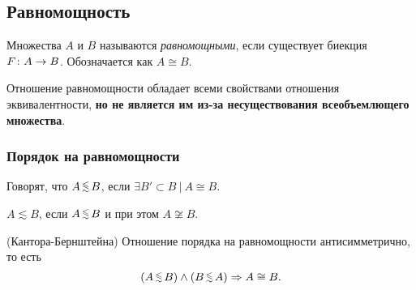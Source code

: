 \subsection{Равномощность}

\begin{definition}
	Множества $A$ и $B$ называются \textit{равномощными}, если существует биекция $F \colon  A \rightarrow B$.
	Обозначается как $A \cong B$.
\end{definition}

\begin{note}
	Отношение равномощности обладает всеми свойствами отношения эквивалентности, \textbf{но не является им из-за несуществования всеобъемлющего множества}.
\end{note}

\subsubsection*{Порядок на равномощности}

\begin{definition}
	Говорят, что $A \leqsim B$, если $\exists B' \subset B\ |\ A \cong B$.
\end{definition}

\begin{definition}
	$A \lesssim B$, если $A \leqsim B$ и при этом $A \not\cong B$.
\end{definition}

\begin{theorem} (Кантора-Бернштейна)
	Отношение порядка на равномощности антисимметрично, то есть
	\[
		(A \leqsim B) \wedge (B \leqsim A) \Ra A \cong B.
	\]
\end{theorem}
